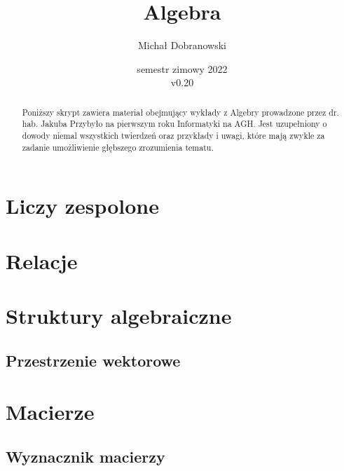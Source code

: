 \documentclass[11pt]{scrartcl}
\title{Algebra}
\author{Michał Dobranowski}
\date{semestr zimowy 2022 \\ v0.20}
\begin{document}
    \maketitle
    \begin{abstract}
        \noindent Poniższy skrypt zawiera materiał obejmujący wykłady z Algebry prowadzone przez dr. hab. Jakuba Przybyło na pierwszym roku Informatyki na AGH. Jest uzupełniony o dowody niemal wszystkich twierdzeń oraz przykłady i uwagi, które mają zwykle za zadanie umożliwienie głębszego zrozumienia tematu.
    \end{abstract}
    \tableofcontents
    \eject

    \section{Liczy zespolone}
    

    \section{Relacje}
    

    \section{Struktury algebraiczne}
    

        \subsection{Przestrzenie wektorowe}
        


    \section{Macierze}
    

        \subsection{Wyznacznik macierzy}
        
\end{document}
